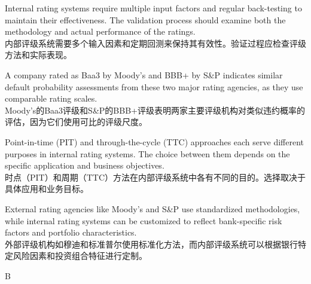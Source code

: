 \documentclass{article}
\begin{document}
\begin{choices}
    \item Internal rating systems require multiple input factors and regular back-testing to maintain their effectiveness. The validation process should examine both the methodology and actual performance of the ratings.\\
    内部评级系统需要多个输入因素和定期回测来保持其有效性。验证过程应检查评级方法和实际表现。
    
    \item A company rated as Baa3 by Moody's and BBB+ by S\&P indicates similar default probability assessments from these two major rating agencies, as they use comparable rating scales.\\
    Moody's的Baa3评级和S\&P的BBB+评级表明两家主要评级机构对类似违约概率的评估，因为它们使用可比的评级尺度。
    
    \item Point-in-time (PIT) and through-the-cycle (TTC) approaches each serve different purposes in internal rating systems. The choice between them depends on the specific application and business objectives.\\
    时点（PIT）和周期（TTC）方法在内部评级系统中各有不同的目的。选择取决于具体应用和业务目标。
    
    \item External rating agencies like Moody's and S\&P use standardized methodologies, while internal rating systems can be customized to reflect bank-specific risk factors and portfolio characteristics.\\
    外部评级机构如穆迪和标准普尔使用标准化方法，而内部评级系统可以根据银行特定风险因素和投资组合特征进行定制。
\end{choices}

\begin{correctanswer}
    B
\end{correctanswer}
\end{document}
